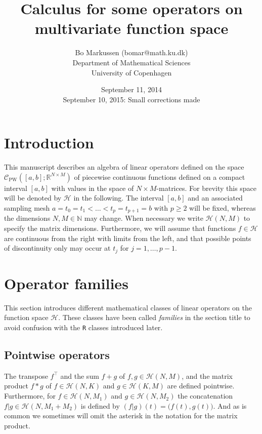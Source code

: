 \documentclass[12pt,a4paper]{article}
\newcommand{\Rset}{\mathbb{R}}
\newcommand{\Nset}{\mathbb{N}}
\begin{document}
\title{Calculus for some operators on multivariate function space}
\author{Bo Markussen (bomar@math.ku.dk) \\ Department of Mathematical Sciences \\ University of Copenhagen}
\date{September 11, 2014 \\ September 10, 2015: Small corrections made}

\maketitle

\section{Introduction}

This manuscript describes an algebra of linear operators defined on the space $\mathcal{C}_\text{PW}([a,b] ; \Rset^{N \times M})$ of piecewise continuous functions defined on a compact interval $[a,b]$ with values in the space of $N \times M$-matrices. For brevity this space will be denoted by $\mathcal{H}$ in the following. The interval $[a,b]$ and an associated sampling mesh $a = t_0 = t_1 < \dotsc < t_p = t_{p+1} = b$ with $p \ge 2$ will be fixed, whereas the dimensions $N, M \in \Nset$ may change. When necessary we write $\mathcal{H}(N,M)$ to specify the matrix dimensions. Furthermore, we will assume that functions $f \in \mathcal{H}$ are continuous from the right with limits from the left, and that possible points of discontinuity only may occur at $t_j$ for $j=1,\dots,p-1$.


\section{Operator families}

This section introduces different mathematical classes of linear operators on the function space $\mathcal{H}$. These classes have been called \emph{families} in the section title to avoid confusion with the \texttt{R} classes introduced later.

\subsection{Pointwise operators}

The transpose $f^\top$ and the sum $f+g$ of $f, g \in \mathcal{H}(N,M)$, and the matrix product $f*g$ of $f \in \mathcal{H}(N,K)$ and $g \in \mathcal{H}(K,M)$ are defined pointwise. Furthermore, for $f \in \mathcal{H}(N,M_1)$ and $g \in \mathcal{H}(N,M_2)$ the concatenation $f \vert g \in \mathcal{H}(N,M_1+M_2)$ is defined by $(f \vert g)(t) = \big( f(t), g(t) \big)$. And as is common we sometimes will omit the asterisk in the notation for the matrix product. 
\end{document}
